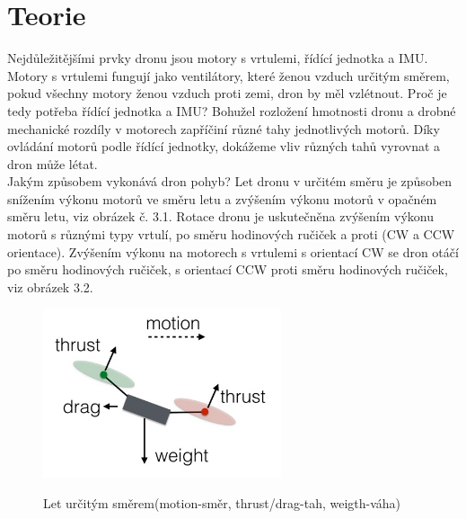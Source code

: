 \chapter{Teorie}
\label{2-teorie}

Nejdůležitějšími prvky dronu jsou motory s vrtulemi, řídící jednotka a IMU. Motory s vrtulemi fungují jako ventilátory, které ženou vzduch určitým směrem, pokud všechny motory ženou vzduch proti zemi, dron by měl vzlétnout. Proč je tedy potřeba řídící jednotka a IMU? Bohužel rozložení hmotnosti dronu a drobné mechanické rozdíly v motorech zapříčiní různé tahy jednotlivých motorů. Díky ovládání motorů podle řídící jednotky, dokážeme vliv různých tahů vyrovnat a dron může létat.\\
Jakým způsobem vykonává dron pohyb? Let dronu v určitém směru je způsoben snížením výkonu motorů ve směru letu a zvýšením výkonu motorů v opačném směru letu, viz obrázek č. 3.1. Rotace dronu je uskutečněna zvýšením výkonu motorů s různými typy vrtulí, po směru hodinových ručiček a proti (CW a CCW orientace). Zvýšením výkonu na motorech s vrtulemi s orientací CW se dron otáčí po směru hodinových ručiček, s orientací CCW proti směru hodinových ručiček, viz obrázek 3.2.\\

\begin{figure}[H]
	\centering
	\includegraphics[width=7cm]{pictures/dronfly.jpg}
	\caption{Let určitým směrem(motion-směr, thrust/drag-tah, weigth-váha)}
	\cite{physicdrone}
\end{figure}


